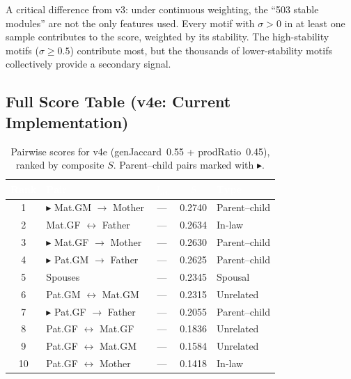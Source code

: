 \documentclass{../yalumba}
\begin{document}

A critical difference from v3: under continuous weighting, the ``503 stable
modules'' are not the only features used.  Every motif with $\sigma > 0$ in at
least one sample contributes to the score, weighted by its stability.  The
high-stability motifs ($\sigma \geq 0.5$) contribute most, but the thousands
of lower-stability motifs collectively provide a secondary signal.

\subsection{Full Score Table (v4e: Current Implementation)}

\begin{table}[H]
  \centering
  \tablestyle
  \caption{Pairwise scores for v4e (genJaccard~0.55 + prodRatio~0.45), ranked
    by composite $S$.  Parent--child pairs marked with $\blacktriangleright$.}
  \label{tab:scores-v4e}
  \begin{tabular}{clccl}
    \toprule
    \rowcolor{table-header}
    \textcolor{white}{\textbf{Rank}} &
    \textcolor{white}{\textbf{Pair}} &
    \textcolor{white}{\textbf{$J_{\text{gen}}$}} &
    \textcolor{white}{\textbf{$S$}} &
    \textcolor{white}{\textbf{Type}} \\
    \midrule
    1 & $\blacktriangleright$ Mat.GM $\to$ Mother
      & --- & 0.2740 & Parent--child \\
    2 & Mat.GF $\leftrightarrow$ Father
      & --- & 0.2634 & In-law \\
    3 & $\blacktriangleright$ Mat.GF $\to$ Mother
      & --- & 0.2630 & Parent--child \\
    4 & $\blacktriangleright$ Pat.GM $\to$ Father
      & --- & 0.2625 & Parent--child \\
    5 & Spouses
      & --- & 0.2345 & Spousal \\
    6 & Pat.GM $\leftrightarrow$ Mat.GM
      & --- & 0.2315 & Unrelated \\
    7 & $\blacktriangleright$ Pat.GF $\to$ Father
      & --- & 0.2055 & Parent--child \\
    8 & Pat.GF $\leftrightarrow$ Mat.GF
      & --- & 0.1836 & Unrelated \\
    9 & Pat.GF $\leftrightarrow$ Mat.GM
      & --- & 0.1584 & Unrelated \\
    10 & Pat.GF $\leftrightarrow$ Mother
      & --- & 0.1418 & In-law \\
    \bottomrule
  \end{tabular}
\end{table}
\end{document}
